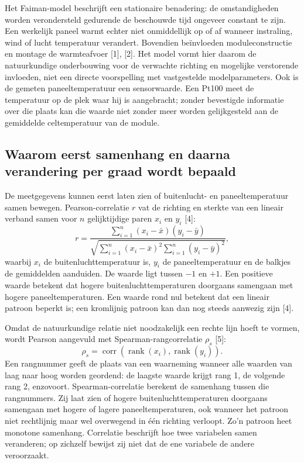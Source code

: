 \documentclass[12pt,a4paper]{article}
\begin{document}
Het Faiman-model beschrijft een stationaire benadering: de omstandigheden worden verondersteld gedurende de beschouwde tijd ongeveer constant te zijn. Een werkelijk paneel warmt echter niet onmiddellijk op of af wanneer instraling, wind of lucht temperatuur verandert. Bovendien beïnvloeden moduleconstructie en montage de warmteafvoer [1], [2]. Het model vormt hier daarom de natuurkundige onderbouwing voor de verwachte richting en mogelijke verstorende invloeden, niet een directe voorspelling met vastgestelde modelparameters. Ook is de gemeten paneeltemperatuur een sensorwaarde. Een Pt100 meet de temperatuur op de plek waar hij is aangebracht; zonder bevestigde informatie over die plaats kan die waarde niet zonder meer worden gelijkgesteld aan de gemiddelde celtemperatuur van de module.

\subsection{Waarom eerst samenhang en daarna verandering per graad wordt bepaald}

De meetgegevens kunnen eerst laten zien of buitenlucht- en paneeltemperatuur samen bewegen. Pearson-correlatie \(r\) vat de richting en sterkte van een lineair verband samen voor \(n\) gelijktijdige paren \(x_i\) en \(y_i\) [4]:
\begin{equation}
r=\frac{\sum_{i=1}^{n}(x_i-\bar{x})(y_i-\bar{y})}
{\sqrt{\sum_{i=1}^{n}(x_i-\bar{x})^2\sum_{i=1}^{n}(y_i-\bar{y})^2}},
\label{eq:pearson}
\end{equation}
waarbij \(x_i\) de buitenluchttemperatuur is, \(y_i\) de paneeltemperatuur en de balkjes de gemiddelden aanduiden. De waarde ligt tussen \(-1\) en \(+1\). Een positieve waarde betekent dat hogere buitenluchttemperaturen doorgaans samengaan met hogere paneeltemperaturen. Een waarde rond nul betekent dat een lineair patroon beperkt is; een kromlijnig patroon kan dan nog steeds aanwezig zijn [4].

Omdat de natuurkundige relatie niet noodzakelijk een rechte lijn hoeft te vormen, wordt Pearson aangevuld met Spearman-rangcorrelatie \(\rho_s\) [5]:
\begin{equation}
\rho_s=\operatorname{corr}\!\left(\operatorname{rank}(x_i),\operatorname{rank}(y_i)\right).
\label{eq:spearman}
\end{equation}
Een rangnummer geeft de plaats van een waarneming wanneer alle waarden van laag naar hoog worden geordend: de laagste waarde krijgt rang 1, de volgende rang 2, enzovoort. Spearman-correlatie berekent de samenhang tussen die rangnummers. Zij laat zien of hogere buitenluchttemperaturen doorgaans samengaan met hogere of lagere paneeltemperaturen, ook wanneer het patroon niet rechtlijnig maar wel overwegend in één richting verloopt. Zo’n patroon heet monotone samenhang. Correlatie beschrijft hoe twee variabelen samen veranderen; op zichzelf bewijst zij niet dat de ene variabele de andere veroorzaakt.
\end{document}
